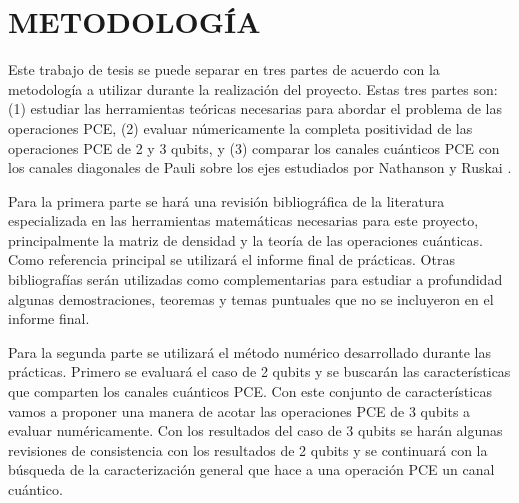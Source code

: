 \chapter{METODOLOGÍA}

Este trabajo de tesis se puede separar 
en tres partes de acuerdo con la metodología a utilizar durante
la realización del proyecto.
Estas tres partes son: (1) estudiar las herramientas 
teóricas necesarias para abordar el problema de las 
operaciones PCE, (2) evaluar númericamente
la completa positividad de las operaciones PCE de 2 y 3 qubits, y (3) 
comparar los canales cuánticos PCE con los canales diagonales de Pauli 
sobre los ejes estudiados por Nathanson y Ruskai \cite{nathanson2007pauli}.

Para la primera parte se hará una revisión bibliográfica de la literatura 
especializada en las herramientas matemáticas necesarias para este 
proyecto, principalmente la matriz de densidad y la teoría
de las operaciones cuánticas. Como referencia principal se utilizará 
el informe final de prácticas. Otras bibliografías serán utilizadas 
como complementarias para estudiar a profundidad algunas demostraciones,
teoremas y temas puntuales que no se incluyeron en el informe final.

Para la segunda parte se utilizará el método numérico desarrollado durante
las prácticas. Primero se evaluará el caso de 2 qubits y se buscarán las 
características que comparten los canales cuánticos PCE. 
Con este conjunto de características vamos a 
proponer una manera de acotar las operaciones PCE de 3 qubits a evaluar 
numéricamente. Con los resultados del caso de 3 qubits 
se harán algunas revisiones de consistencia con los resultados de 2 qubits 
y se continuará con la búsqueda de la caracterización general que hace 
a una operación PCE un canal cuántico.

